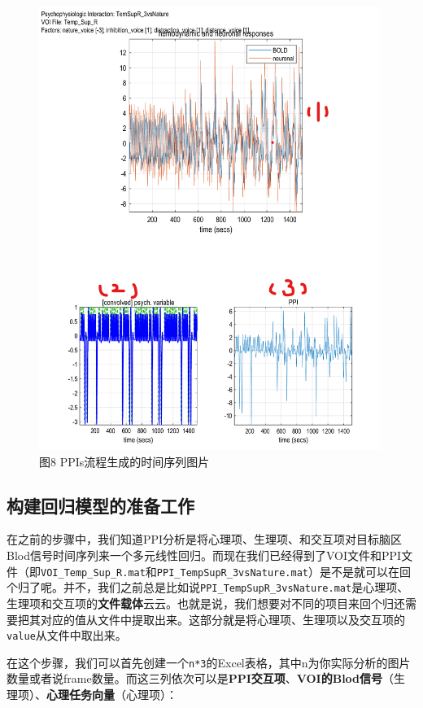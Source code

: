 \documentclass[
]{article}
\begin{document}
\begin{figure}
\centering
\includegraphics[width=4.375in,height=\textheight]{PPIs_images.png}
\caption{图8 PPIs流程生成的时间序列图片}
\end{figure}

\hypertarget{ux6784ux5efaux56deux5f52ux6a21ux578bux7684ux51c6ux5907ux5de5ux4f5c}{%
\subsection{构建回归模型的准备工作}\label{ux6784ux5efaux56deux5f52ux6a21ux578bux7684ux51c6ux5907ux5de5ux4f5c}}

在之前的步骤中，我们知道PPI分析是将心理项、生理项、和交互项对目标脑区Blod信号时间序列来一个多元线性回归。而现在我们已经得到了VOI文件和PPI文件（即\texttt{VOI\_Temp\_Sup\_R.mat}和\texttt{PPI\_TempSupR\_3vsNature.mat}）是不是就可以在回个归了呢。并不，我们之前总是比如说\texttt{PPI\_TempSupR\_3vsNature.mat}是心理项、生理项和交互项的\textbf{文件载体}云云。也就是说，我们想要对不同的项目来回个归还需要把其对应的值从文件中提取出来。这部分就是将心理项、生理项以及交互项的\texttt{value}从文件中取出来。

在这个步骤，我们可以首先创建一个\texttt{n*3}的Excel表格，其中n为你实际分析的图片数量或者说frame数量。而这三列依次可以是\textbf{PPI交互项}、\textbf{VOI的Blod信号}（生理项）、\textbf{心理任务向量}（心理项）：
\end{document}
